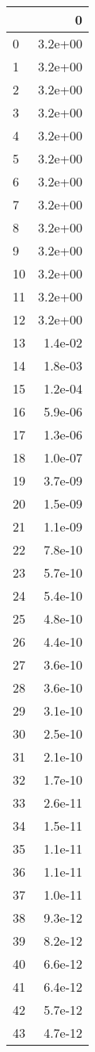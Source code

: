 \begin{tabular}{lr}
\toprule
{} &       0 \\
\midrule
0   & 3.2e+00 \\
1   & 3.2e+00 \\
2   & 3.2e+00 \\
3   & 3.2e+00 \\
4   & 3.2e+00 \\
5   & 3.2e+00 \\
6   & 3.2e+00 \\
7   & 3.2e+00 \\
8   & 3.2e+00 \\
9   & 3.2e+00 \\
10  & 3.2e+00 \\
11  & 3.2e+00 \\
12  & 3.2e+00 \\
13  & 1.4e-02 \\
14  & 1.8e-03 \\
15  & 1.2e-04 \\
16  & 5.9e-06 \\
17  & 1.3e-06 \\
18  & 1.0e-07 \\
19  & 3.7e-09 \\
20  & 1.5e-09 \\
21  & 1.1e-09 \\
22  & 7.8e-10 \\
23  & 5.7e-10 \\
24  & 5.4e-10 \\
25  & 4.8e-10 \\
26  & 4.4e-10 \\
27  & 3.6e-10 \\
28  & 3.6e-10 \\
29  & 3.1e-10 \\
30  & 2.5e-10 \\
31  & 2.1e-10 \\
32  & 1.7e-10 \\
33  & 2.6e-11 \\
34  & 1.5e-11 \\
35  & 1.1e-11 \\
36  & 1.1e-11 \\
37  & 1.0e-11 \\
38  & 9.3e-12 \\
39  & 8.2e-12 \\
40  & 6.6e-12 \\
41  & 6.4e-12 \\
42  & 5.7e-12 \\
43  & 4.7e-12 \\

\end{tabular}
